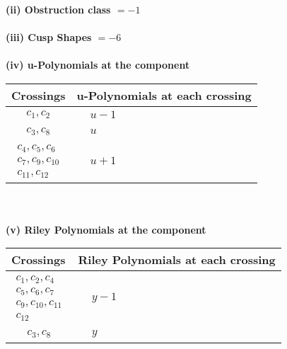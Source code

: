\documentclass[1p]{elsarticle_modified}
\theoremstyle{definition}
\begin{document}
\flushleft \textbf{(ii) Obstruction class $= -1$}\\~\\
\flushleft \textbf{(iii) Cusp Shapes $= -6$}\\~\\
\newpage\renewcommand{\arraystretch}{1}
\flushleft \textbf{(iv) u-Polynomials at the component}\newline \\
\begin{tabular}{m{50pt}|m{274pt}}
Crossings & \hspace{64pt}u-Polynomials at each crossing \\
\hline $$\begin{aligned}c_{1},c_{2}\end{aligned}$$&$\begin{aligned}
&u-1
\end{aligned}$\\
\hline $$\begin{aligned}c_{3},c_{8}\end{aligned}$$&$\begin{aligned}
&u
\end{aligned}$\\
\hline $$\begin{aligned}c_{4},c_{5},c_{6}\\c_{7},c_{9},c_{10}\\c_{11},c_{12}\end{aligned}$$&$\begin{aligned}
&u+1
\end{aligned}$\\
\hline
\end{tabular}\\~\\
\newpage\renewcommand{\arraystretch}{1}
\flushleft \textbf{(v) Riley Polynomials at the component}\newline \\
\begin{tabular}{m{50pt}|m{274pt}}
Crossings & \hspace{64pt}Riley Polynomials at each crossing \\
\hline $$\begin{aligned}c_{1},c_{2},c_{4}\\c_{5},c_{6},c_{7}\\c_{9},c_{10},c_{11}\\c_{12}\end{aligned}$$&$\begin{aligned}
&y-1
\end{aligned}$\\
\hline $$\begin{aligned}c_{3},c_{8}\end{aligned}$$&$\begin{aligned}
&y
\end{aligned}$\\
\hline
\end{tabular}\\~\\
\end{document}
